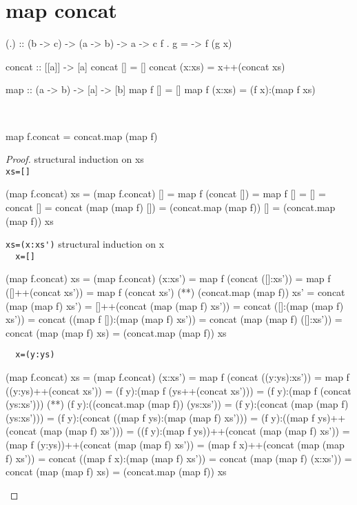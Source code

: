 \section{map concat}
\begin{code}
(.) :: (b -> c) -> (a -> b) -> a -> c
f . g = \x -> f (g x)
\end{code}
\begin{code}
concat :: [[a]] -> [a]
concat []     = []
concat (x:xs) = x++(concat xs)
\end{code}
\begin{code}
map :: (a -> b) -> [a] -> [b] 
map f []     = []
map f (x:xs) = (f x):(map f xs)
\end{code}
\begin{claim}\ 
\begin{code}
map f.concat = concat.map (map f)
\end{code}
\end{claim}
\begin{proof}structural induction on xs\\
\verb|xs=[]|
\begin{code}
(map f.concat) xs = (map f.concat) []
                  = map f (concat [])
                  = map f []
                  = []
                  = concat []
                  = concat (map (map f) [])
                  = (concat.map (map f)) []
                  = (concat.map (map f)) xs
\end{code}
\verb|xs=(x:xs')|
structural induction on x\\
\verb|  x=[]|
\begin{code}
(map f.concat) xs = (map f.concat) (x:xs')
                  = map f (concat ([]:xs'))
                  = map f ([]++(concat xs'))
                  = map f (concat xs')
                  (**) (concat.map (map f)) xs'
                  = concat (map (map f) xs')
                  = []++(concat (map (map f) xs'))
                  = concat ([]:(map (map f) xs'))
                  = concat ((map f []):(map (map f) xs'))
                  = concat (map (map f) ([]:xs'))
                  = concat (map (map f) xs)
                  = (concat.map (map f)) xs
\end{code}
\verb|  x=(y:ys)|
\begin{code}
(map f.concat) xs = (map f.concat) (x:xs')
                  = map f (concat ((y:ys):xs'))
                  = map f ((y:ys)++(concat xs'))
                  = (f y):(map f (ys++(concat xs')))
                  = (f y):(map f (concat (ys:xs')))
                  (**) (f y):((concat.map (map f)) (ys:xs'))
                  = (f y):(concat (map (map f) (ys:xs')))
                  = (f y):(concat ((map f ys):(map (map f) xs')))
                  = (f y):((map f ys)++(concat (map (map f) xs')))
                  = ((f y):(map f ys))++(concat (map (map f) xs'))
                  = (map f (y:ys))++(concat (map (map f) xs'))
                  = (map f x)++(concat (map (map f) xs'))
                  = concat ((map f x):(map (map f) xs'))
                  = concat (map (map f) (x:xs'))
                  = concat (map (map f) xs)
                  = (concat.map (map f)) xs
\end{code}
\end{proof}
